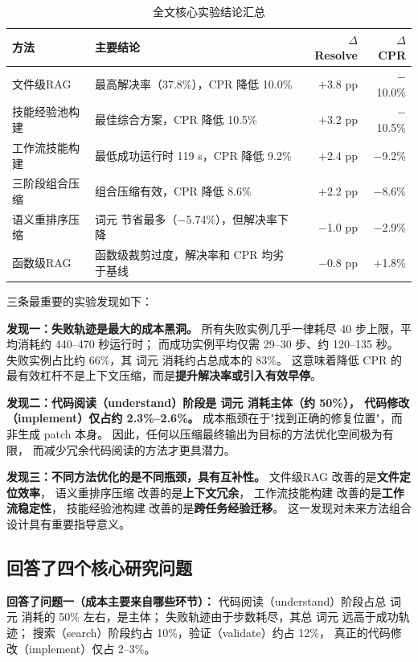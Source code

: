 \begin{table}[htbp]
  \centering
  \caption{全文核心实验结论汇总}
  \label{tab:conclusion-summary}
  \begin{tabularx}{\textwidth}{lXrr}
    \toprule
    方法 & 主要结论 & $\Delta$Resolve & $\Delta$CPR \\
    \midrule
    文件级RAG          & 最高解决率（37.8\%），CPR 降低 10.0\%      & $+$3.8 pp & $-$10.0\% \\
    技能经验池构建  & 最佳综合方案，CPR 降低 10.5\%             & $+$3.2 pp & $-$10.5\% \\
    工作流技能构建 & 最低成功运行时 119 s，CPR 降低 9.2\%      & $+$2.4 pp & $-$9.2\%  \\
    三阶段组合压缩  & 组合压缩有效，CPR 降低 8.6\%             & $+$2.2 pp & $-$8.6\%  \\
    语义重排序压缩& 词元 节省最多（$-$5.74\%），但解决率下降  & $-$1.0 pp & $-$2.9\%  \\
    函数级RAG      & 函数级裁剪过度，解决率和 CPR 均劣于基线   & $-$0.8 pp & $+$1.8\%  \\
    \bottomrule
  \end{tabularx}
\end{table}

三条最重要的实验发现如下：

\textbf{发现一：失败轨迹是最大的成本黑洞。}
所有失败实例几乎一律耗尽 40 步上限，平均消耗约 440--470 秒运行时；
而成功实例平均仅需 29--30 步、约 120--135 秒。
失败实例占比约 66\%，其 词元 消耗约占总成本的 83\%。
这意味着降低 CPR 的最有效杠杆不是上下文压缩，而是\textbf{提升解决率或引入有效早停}。

\textbf{发现二：代码阅读（understand）阶段是 词元 消耗主体（约 50\%），
代码修改（implement）仅占约 2.3\%--2.6\%。}
成本瓶颈在于"找到正确的修复位置"，而非生成 patch 本身。
因此，任何以压缩最终输出为目标的方法优化空间极为有限，
而减少冗余代码阅读的方法才更具潜力。

\textbf{发现三：不同方法优化的是不同瓶颈，具有互补性。}
文件级RAG 改善的是\textbf{文件定位效率}，
语义重排序压缩 改善的是\textbf{上下文冗余}，
工作流技能构建 改善的是\textbf{工作流稳定性}，
技能经验池构建 改善的是\textbf{跨任务经验迁移}。
这一发现对未来方法组合设计具有重要指导意义。

\subsection{回答了四个核心研究问题}
\label{subsec:回答了四个核心-answers}

\textbf{回答了问题一（成本主要来自哪些环节）：}
代码阅读（understand）阶段占总 词元 消耗的 50\% 左右，是主体；
失败轨迹由于步数耗尽，其总 词元 远高于成功轨迹；
搜索（search）阶段约占 10\%，验证（validate）约占 12\%，
真正的代码修改（implement）仅占 2--3\%。

